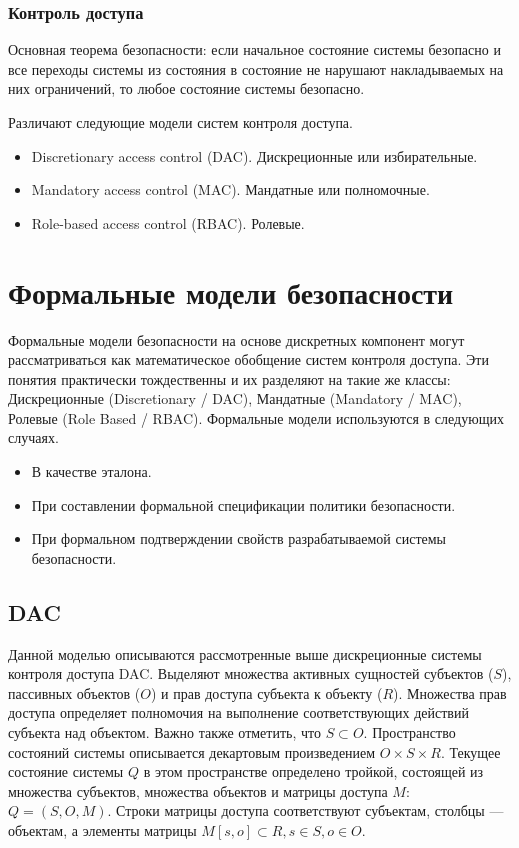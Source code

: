 \begin{frame}
\frametitle{Контроль доступа}
\begin{definition}%
    \alert{Основная теорема безопасности}: если начальное состояние системы безопасно и все переходы системы из
    состояния в состояние не нарушают накладываемых на них ограничений, то любое состояние системы безопасно.
\end{definition}
Различают следующие модели систем контроля доступа.
\begin{itemize}
    \item Discretionary access control (DAC). Дискреционные или избирательные.
    \item Mandatory access control (MAC). Мандатные или полномочные.
    \item Role-based access control (RBAC). Ролевые. 
\end{itemize}
\end{frame}


\section{Формальные модели безопасности}

Формальные модели безопасности на основе дискретных компонент могут рассматриваться как математическое обобщение систем контроля доступа. Эти понятия практически тождественны и их разделяют на такие же классы: Дискреционные (Discretionary / DAC), Мандатные (Mandatory / MAC), Ролевые (Role Based / RBAC). 
Формальные модели используются в следующих случаях.
\begin{itemize}
    \item В качестве эталона.
    \item При составлении формальной спецификации политики безопасности.
    \item При формальном подтверждении свойств разрабатываемой системы безопасности.
\end{itemize}


\subsection{DAC}

Данной моделью описываются рассмотренные выше дискреционные системы контроля доступа DAC.  
Выделяют множества активных сущностей субъектов ($S$), пассивных объектов ($O$) и прав доступа субъекта к объекту ($R$). Множества прав доступа определяет полномочия на выполнение соответствующих действий субъекта над объектом. Важно также отметить, что $S\subset O$. Пространство состояний системы описывается декартовым произведением $O\times S\times R$. Текущее состояние системы $Q$ в этом пространстве определено тройкой, состоящей из множества субъектов, множества объектов и матрицы доступа $M$: $Q=(S, O, M)$. Строки матрицы доступа соответствуют субъектам, столбцы --- объектам, а элементы матрицы $M[s,o]\subset R, s\in S, o\in O$.



